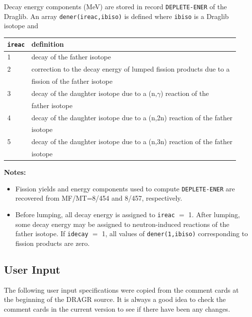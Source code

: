 Decay energy components (MeV) are stored in record {\tt DEPLETE-ENER} of the
Draglib. An array {\tt dener(ireac,ibiso)} is defined where {\tt ibiso} is a
Draglib isotope and

\begin{tabular}{ l l }
\hline
{\tt ireac} & definition \\
\hline
1 & decay of the father isotope \\
2 & correction to the decay energy of lumped fission products due to a \\
& fission of the father isotope \\
3 & decay of the daughter isotope due to a (n,$\gamma$) reaction of the \\
& father isotope \\
4 & decay of the daughter isotope due to a (n,2n) reaction of the father \\
& isotope  \\
5 & decay of the daughter isotope due to a (n,3n) reaction of the father \\
& isotope \\
\hline
\end{tabular}

\vskip 0.3cm

{\bf Notes:}
\begin{itemize}
\item Fission yields and energy components used to compute {\tt DEPLETE-ENER}
are recovered from MF/MT=8/454 and 8/457, respectively.
\item Before lumping, all decay energy is assigned to {\tt ireac} $=$ 1. After
lumping, some decay energy may be assigned to neutron-induced reactions of the
father isotope. If {\tt idecay} $=$ 1, all values of {\tt dener(1,ibiso)}
corresponding to fission products are zero.
\end{itemize}

\subsection{User Input}
\label{ssDRAGR_inp}

The following user input specifications were copied from the comment
cards at the beginning of the DRAGR source.  It is always a good idea
to check the comment cards in the current version to see if there
have been any changes.

